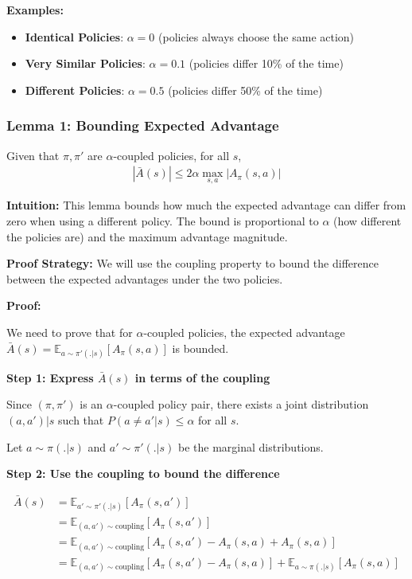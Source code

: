 \textbf{Examples:}
\begin{itemize}
    \item \textbf{Identical Policies}: $\alpha = 0$ (policies always choose the same action)
    \item \textbf{Very Similar Policies}: $\alpha = 0.1$ (policies differ 10\% of the time)
    \item \textbf{Different Policies}: $\alpha = 0.5$ (policies differ 50\% of the time)
\end{itemize}

\subsubsection{Lemma 1: Bounding Expected Advantage}

\begin{lemma}
    Given that $\pi, \pi'$ are $\alpha$-coupled policies, for all $s$,
    \begin{align*}
        |\bar{A}(s)| \le 2\alpha \max_{s, a}|A_{\pi}(s,a)|
    \end{align*}
\end{lemma}

\textbf{Intuition:}
This lemma bounds how much the expected advantage can differ from zero when using a different policy. The bound is proportional to $\alpha$ (how different the policies are) and the maximum advantage magnitude.

\textbf{Proof Strategy:}
We will use the coupling property to bound the difference between the expected advantages under the two policies.

\textbf{Proof:}

We need to prove that for $\alpha$-coupled policies, the expected advantage $\bar{A}(s) = \mathbb{E}_{a \sim \pi'(.|s)}[A_{\pi}(s, a)]$ is bounded.

\textbf{Step 1: Express $\bar{A}(s)$ in terms of the coupling}

Since $(\pi, \pi')$ is an $\alpha$-coupled policy pair, there exists a joint distribution $(a, a')|s$ such that $P(a \neq a'|s) \le \alpha$ for all $s$.

Let $a \sim \pi(.|s)$ and $a' \sim \pi'(.|s)$ be the marginal distributions.

\textbf{Step 2: Use the coupling to bound the difference}

\begin{align}
\bar{A}(s) &= \mathbb{E}_{a' \sim \pi'(.|s)}[A_{\pi}(s, a')] \\
&= \mathbb{E}_{(a,a') \sim \text{coupling}}[A_{\pi}(s, a')] \\
&= \mathbb{E}_{(a,a') \sim \text{coupling}}[A_{\pi}(s, a') - A_{\pi}(s, a) + A_{\pi}(s, a)] \\
&= \mathbb{E}_{(a,a') \sim \text{coupling}}[A_{\pi}(s, a') - A_{\pi}(s, a)] + \mathbb{E}_{a \sim \pi(.|s)}[A_{\pi}(s, a)]
\end{align}

